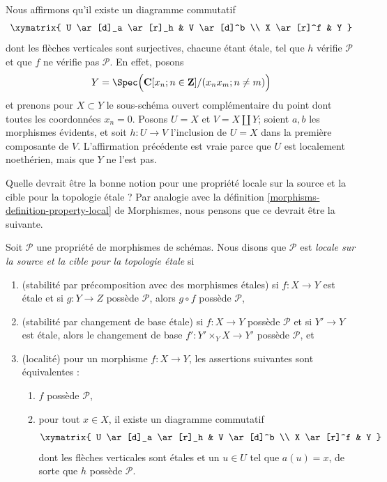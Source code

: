 \begin{example}
\medskip\noindent
Nous affirmons qu'il existe un diagramme commutatif
$$
\xymatrix{
U \ar[d]_a \ar[r]_h & V \ar[d]^b \\
X \ar[r]^f & Y
}
$$
dont les flèches verticales sont surjectives, chacune étant \'etale, tel que $h$ vérifie
$\mathcal{P}$ et que $f$ ne vérifie pas $\mathcal{P}$. En effet, posons
$$
Y =
\Spec\Big(
\mathbf{C}[x_n; n \in \mathbf{Z}]/(x_n x_m; n \not = m)
\Big)
$$
et prenons pour $X \subset Y$ le sous-schéma ouvert complémentaire du point
dont toutes les coordonnées $x_n = 0$. Posons $U = X$ et
$V = X \amalg Y$; soient $a, b$ les morphismes évidents, et soit
$h : U \to V$ l'inclusion de $U = X$ dans la première composante de $V$.
L'affirmation précédente est vraie parce que $U$ est localement noethérien,
mais que $Y$ ne l'est pas.
\end{example}

\noindent
Quelle devrait être la bonne notion pour une propriété locale sur la source et
la cible pour la topologie \'etale ? Par analogie avec la
définition \ref{morphisms-definition-property-local} de Morphismes, nous pensons
que ce devrait être la suivante.

\begin{definition}
\label{definition-local-source-target}
Soit $\mathcal{P}$ une propriété de morphismes de schémas.
Nous disons que $\mathcal{P}$ est {\it locale sur la source et la cible pour
la topologie \'etale} si
\begin{enumerate}
\item (stabilité par précomposition avec des morphismes étales)
si $f : X \to Y$ est \'etale et si $g : Y \to Z$ possède $\mathcal{P}$,
alors $g \circ f$ possède $\mathcal{P}$,
\item (stabilité par changement de base \'etale)
si $f : X \to Y$ possède $\mathcal{P}$ et si $Y' \to Y$ est \'etale, alors
le changement de base $f' : Y' \times_Y X \to Y'$ possède $\mathcal{P}$, et
\item (localité) pour un morphisme $f : X \to Y$, les assertions suivantes
sont équivalentes :
\begin{enumerate}
\item $f$ possède $\mathcal{P}$,
\item pour tout $x \in X$, il existe un diagramme commutatif
$$
\xymatrix{
U \ar[d]_a \ar[r]_h & V \ar[d]^b \\
X \ar[r]^f & Y
}
$$
dont les flèches verticales sont étales et un $u \in U$ tel que
$a(u) = x$, de sorte que $h$ possède $\mathcal{P}$.
\end{enumerate}
\end{enumerate}
\end{definition}

